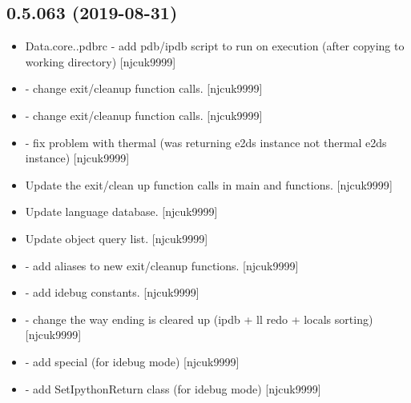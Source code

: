\documentclass[a4paper,10pt,english]{report}
\begin{document}
\subsection{0.5.063 (2019-08-31)}
\label{\detokenize{misc/changelog:id79}}\begin{itemize}
\item {} 
Data.core..pdbrc - add pdb/ipdb script to run on execution (after
copying to working directory) {[}njcuk9999{]}

\item {} 
 - change exit/cleanup function
calls. {[}njcuk9999{]}

\item {} 
 - change exit/cleanup function calls.
{[}njcuk9999{]}

\item {} 
 - fix problem with thermal (was returning
e2ds instance not thermal e2ds instance) {[}njcuk9999{]}

\item {} 
Update the exit/clean up function calls in main and 
functions. {[}njcuk9999{]}

\item {} 
Update language database. {[}njcuk9999{]}

\item {} 
Update object query list. {[}njcuk9999{]}

\item {} 
 - add aliases to new exit/cleanup functions.
{[}njcuk9999{]}

\item {} 
 - add idebug constants.
{[}njcuk9999{]}

\item {} 
 - change the way ending is cleared up (ipdb +
ll redo + locals sorting) {[}njcuk9999{]}

\item {} 
 - add special  (for idebug
mode) {[}njcuk9999{]}

\item {} 
 - add SetIpythonReturn class (for idebug
mode) {[}njcuk9999{]}


\end{itemize}
\end{document}
